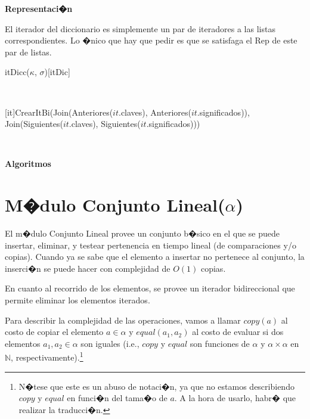 \documentclass[a4paper,10pt]{article}
\newenvironment{Representacion}{%
  \vspace*{2ex}%
  \noindent\textbf{\Large Representaci�n}%
  \vspace*{2ex}%
}{}
\newenvironment{Algoritmos}{%
  \vspace*{2ex}%
  \noindent\textbf{\Large Algoritmos}%
  \vspace*{2ex}%
}{}
\begin{document}
\begin{Representacion}
  El iterador del diccionario es simplemente un par de iteradores a las listas correspondientes.  Lo �nico que hay que pedir es que se satisfaga el Rep de este par de listas.

  \begin{Estructura}{itDicc($\kappa$, $\sigma$)}[itDic]
    \begin{Tupla}[itDic]%
    \end{Tupla}
  \end{Estructura}


  ~

  [it]{CrearItBi(Join(Anteriores($it$.claves), Anteriores($it$.significados)), \\\phantom{CrearItBi(}Join(Siguientes($it$.claves), Siguientes($it$.significados)))}\mbox{}

  ~


\end{Representacion}

\begin{Algoritmos}
  
\end{Algoritmos}

\section{M�dulo Conjunto Lineal($\alpha$)}
\label{sec:ConjuntoLineal}

El m�dulo Conjunto Lineal provee un conjunto b�sico en el que se puede insertar, eliminar, y testear pertenencia en tiempo lineal (de comparaciones y/o copias).  Cuando ya se sabe que el elemento a insertar no pertenece al conjunto, la inserci�n se puede hacer con complejidad de $O(1)$ copias.

En cuanto al recorrido de los elementos, se provee un iterador bidireccional que permite eliminar los elementos iterados.  

Para describir la complejidad de las operaciones, vamos a llamar $copy(a)$ al costo de copiar el elemento $a \in \alpha$ y $equal(a_1, a_2)$ al costo de evaluar si dos elementos $a_1, a_2 \in \alpha$ son iguales (i.e., $copy$ y $equal$ son funciones de $\alpha$ y $\alpha \times \alpha$ en $\mathbb{N}$, respectivamente).\footnote{N�tese que este es un abuso de notaci�n, ya que no estamos describiendo $copy$ y $equal$ en funci�n del tama�o de $a$.  A la hora de usarlo, habr� que realizar la traducci�n.}
\end{document}
